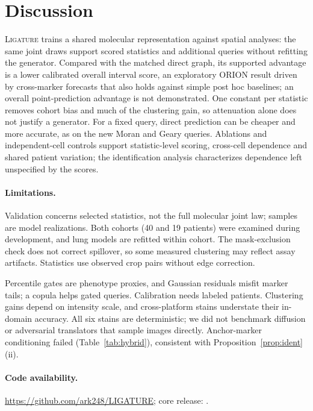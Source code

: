 \documentclass[10pt,letterpaper]{article}
\theoremstyle{definition}
\theoremstyle{remark}
\newcommand{\method}{\textnormal{\textsc{Ligature}}}
\begin{document}
\section{Discussion}
\label{sec:discussion}

\method{} trains a shared molecular representation against spatial analyses: the same joint draws support scored statistics and additional queries without refitting the generator. Compared with the matched direct graph, its supported advantage is a lower calibrated overall interval score, an exploratory ORION result driven by cross-marker forecasts that also holds against simple post hoc baselines; an overall point-prediction advantage is not demonstrated. One constant per statistic removes cohort bias and much of the clustering gain, so attenuation alone does not justify a generator. For a fixed query, direct prediction can be cheaper and more accurate, as on the new Moran and Geary queries. Ablations and independent-cell controls support statistic-level scoring, cross-cell dependence and shared patient variation; the identification analysis characterizes dependence left unspecified by the scores.

\paragraph{Limitations.} Validation concerns selected statistics, not the full molecular joint law; samples are model realizations. Both cohorts (40 and 19 patients) were examined during development, and lung models are refitted within cohort. The mask-exclusion check does not correct spillover, so some measured clustering may reflect assay artifacts. Statistics use observed crop pairs without edge correction.

Percentile gates are phenotype proxies, and Gaussian residuals misfit marker tails; a copula helps gated queries. Calibration needs labeled patients. Clustering gains depend on intensity scale, and cross-platform stains understate their in-domain accuracy. All six stains are deterministic; we did not benchmark diffusion or adversarial translators that sample images directly. Anchor-marker conditioning failed (Table~\ref{tab:hybrid}), consistent with Proposition~\ref{prop:ident}(ii).

\paragraph{Code availability.} \url{https://github.com/ark248/LIGATURE}; core release: .
\end{document}
